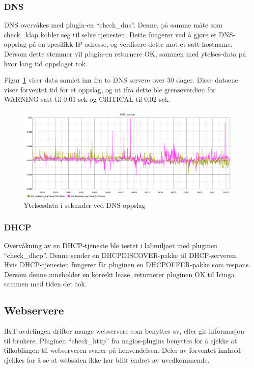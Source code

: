 \subsubsection*{DNS}

DNS overvåkes med plugin-en ``check\_dns''. Denne, på samme måte som check\_ldap kobler seg til selve tjenesten. Dette fungerer ved å gjøre et DNS-oppslag på en spesifikk IP-adresse, og verifisere dette mot et satt hostname. Dersom dette stemmer vil plugin-en returnere OK, sammen med ytelses-data på hvor lang tid oppslaget tok.

Figur \ref{dns-inv} viser data samlet inn fra to DNS servere over 30 dager. Disse dataene viser forventet tid for et oppslag, og ut ifra dette ble grenseverdien for WARNING satt til 0.01 sek og CRITICAL til 0.02 sek.

\begin{figure}[H]
    \centering
    \includegraphics[width=1.0\textwidth]{img/dns-inv}
    \caption{Ytelsesdata i sekunder ved DNS-oppslag}
    \label{dns-inv}
\end{figure}

\subsubsection*{DHCP}
Overvåkning av en DHCP-tjeneste ble testet i labmiljøet med pluginen ``check\_dhcp''. Denne sender en DHCPDISCOVER-pakke til DHCP-serveren. Hvis DHCP-tjenesten fungerer får pluginen en DHCPOFFER-pakke som respons. Dersom denne inneholder en korrekt lease, returnerer pluginen OK til Icinga sammen med tiden det tok.

\subsection{Webservere}\label{webservere}
IKT-avdelingen drifter mange webservere som benyttes av, eller gir informasjon til brukere. Pluginen ``check\_http'' \cite{checkhttp} fra nagios-plugins benyttes for å sjekke at tilkoblingen til webserveren svarer på henvendelsen. Deler av forventet innhold sjekkes for å se at websiden ikke har blitt endret av uvedkommende.

